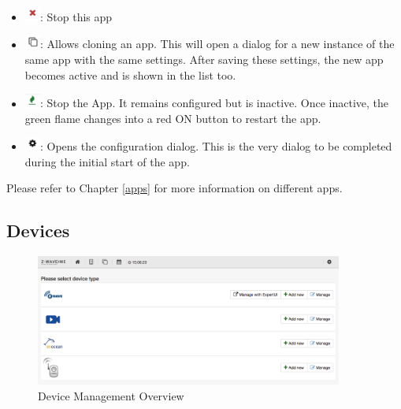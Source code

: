 \begin{itemize}
\item \includegraphics[width=0.04\textwidth]{pngs/redcross.png}: Stop this app
\item \includegraphics[width=0.04\textwidth]{pngs/double.png}: Allows cloning an app. This will open a dialog for a new instance of the 
same app with the same settings. After saving these settings, the new app becomes active 
and is shown in the list too.
\item \includegraphics[width=0.04\textwidth]{pngs/greenflame.png}: Stop the App. It remains configured but is inactive. Once inactive, 
the green flame changes into a red ON button to restart the app.
\item \includegraphics[width=0.04\textwidth]{pngs/wheel.png}: Opens the configuration dialog. This is the very dialog to be completed 
during the initial start of the app.
\end{itemize}

Please refer to Chapter \ref{apps} for more information on different apps.

\subsection{Devices}

\begin{figure}
\begin{center}
\includegraphics[width=0.9\textwidth]{pngs/cap4/433_5.png}
\caption{Device Management Overview}
\label{device0}
\end{center}
\end{figure}



